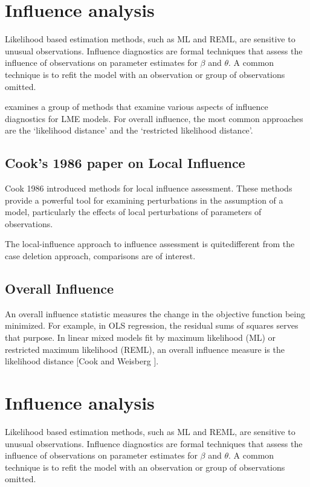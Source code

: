 \documentclass[12pt, a4paper]{article}
\begin{document}
\section{Influence analysis} %

Likelihood based estimation methods, such as ML and REML, are sensitive to unusual observations. Influence diagnostics are formal techniques that assess the influence of observations on parameter estimates for $\beta$ and $\theta$. A common technique is to refit the model with an observation or group of observations omitted.

\citet{west} examines a group of methods that examine various aspects of influence diagnostics for LME models.
For overall influence, the most common approaches are the `likelihood distance' and the `restricted likelihood distance'.


\subsection{Cook's 1986 paper on Local Influence}%
Cook 1986 introduced methods for local influence assessment. These methods provide a powerful tool for examining perturbations in the assumption of a model, particularly the effects of local perturbations of parameters of observations.

The local-influence approach to influence assessment is quitedifferent from the case deletion approach, comparisons are of
interest.



\subsection{Overall Influence}
An overall influence statistic measures the change in the objective function being minimized. For example, in
OLS regression, the residual sums of squares serves that purpose. In linear mixed models fit by
 maximum likelihood (ML) or  restricted maximum likelihood (REML), an overall influence measure is the  likelihood distance [Cook and Weisberg ].



\section{Influence analysis} %

Likelihood based estimation methods, such as ML and REML, are sensitive to unusual observations. Influence diagnostics are formal techniques that assess the influence of observations on parameter estimates for $\beta$ and $\theta$. A common technique is to refit the model with an observation or group of observations omitted.
\end{document}
